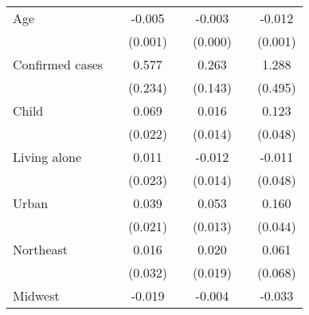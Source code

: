 {\begin{tabular}{l*{6}{c}}
\addlinespace
Age                 &                     &      -0.005\sym{***}&                     &      -0.003\sym{***}&                     &      -0.012\sym{***}\\
                    &                     &     (0.001)         &                     &     (0.000)         &                     &     (0.001)         \\
\addlinespace
Confirmed cases     &                     &       0.577\sym{**} &                     &       0.263\sym{*}  &                     &       1.288\sym{***}\\
                    &                     &     (0.234)         &                     &     (0.143)         &                     &     (0.495)         \\
\addlinespace
Child               &                     &       0.069\sym{***}&                     &       0.016         &                     &       0.123\sym{**} \\
                    &                     &     (0.022)         &                     &     (0.014)         &                     &     (0.048)         \\
\addlinespace
Living alone        &                     &       0.011         &                     &      -0.012         &                     &      -0.011         \\
                    &                     &     (0.023)         &                     &     (0.014)         &                     &     (0.048)         \\
\addlinespace
Urban               &                     &       0.039\sym{*}  &                     &       0.053\sym{***}&                     &       0.160\sym{***}\\
                    &                     &     (0.021)         &                     &     (0.013)         &                     &     (0.044)         \\
\addlinespace
Northeast           &                     &       0.016         &                     &       0.020         &                     &       0.061         \\
                    &                     &     (0.032)         &                     &     (0.019)         &                     &     (0.068)         \\
\addlinespace
Midwest             &                     &      -0.019         &                     &      -0.004         &                     &      -0.033         \\

\end{tabular}}
